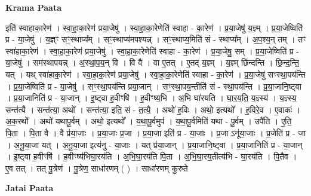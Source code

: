 \documentclass[17pt]{extarticle}
\begin{document}
\textbf{Krama Paata} \newline

इति॑ स्वाहाका॒रेण॑ । स्वा॒हा॒का॒रेण॑ प्रया॒जेषु॑ । स्वा॒हा॒का॒रेणेति॑ स्वाहा - का॒रेण॑ । प्र॒या॒जेषु॑ य॒ज्ञ्म् । प्र॒या॒जेष्विति॑ प्र - या॒जेषु॑ । य॒ज्ञ्ꣳ सꣳ॒॒स्थाप्य᳚म् । सꣳ॒॒स्थाप्य॑मपश्यन्न् । सꣳ॒॒स्थाप्य॒मिति॑ सं - स्थाप्य᳚म् । अ॒प॒श्य॒न् तम् । तꣳ स्वा॑हाका॒रेण॑ । स्वा॒हा॒का॒रेण॑ प्रया॒जेषु॑ । स्वा॒हा॒का॒रेणेति॑ स्वाहा - का॒रेण॑ । प्र॒या॒जेषु॒ सम् । प्र॒या॒जेष्विति॑ प्र - या॒जेषु॑ । सम॑स्थापयन्न् । अ॒स्था॒प॒य॒न् वि । वि वै । वा ए॒तत् । ए॒तद् य॒ज्ञ्म् । य॒ज्ञ्म् छि॑न्दन्ति । छि॒न्द॒न्ति॒ यत् । यथ् स्वा॑हाका॒रेण॑ । स्वा॒हा॒का॒रेण॑ प्रया॒जेषु॑ । स्वा॒हा॒का॒रेणेति॑ स्वाहा - का॒रेण॑ । प्र॒या॒जेषु॑ सꣳस्था॒पय॑न्ति । प्र॒या॒जेष्विति॑ प्र - या॒जेषु॑ । सꣳ॒॒स्था॒पय॑न्ति प्रया॒जान् । सꣳ॒॒स्था॒पय॒न्तीति॑ सं - स्था॒पय॑न्ति । प्र॒या॒जानि॒ष्ट्वा । प्र॒या॒जानिति॑ प्र - या॒जान् । इ॒ष्ट्वा ह॒वीꣳषि॑ । ह॒वीꣳष्य॒भि । अ॒भि घा॑रयति । घा॒र॒य॒ति॒ य॒ज्ञ्स्य॑ । य॒ज्ञ्स्य॒ सन्त॑त्यै । सन्त॑त्या॒ अथो᳚ । सन्त॑त्या॒ इति॒ सं - त॒त्यै॒ । अथो॑ ह॒विः । अथो॒ इत्यथो᳚ । ह॒विरे॒व । ए॒वाकः॑ । अ॒क॒रथो᳚ । अथो॑ यथापू॒र्वम् । अथो॒ इत्यथो᳚ । य॒था॒पू॒र्वमुप॑ । य॒था॒पू॒र्वमिति॑ यथा - पू॒र्वम् । उपै॑ति । ए॒ति॒ पि॒ता । पि॒ता वै । वै प्र॑या॒जाः । प्र॒या॒जाः प्र॒जा । प्र॒या॒जा इति॑ प्र - या॒जाः । प्र॒जा ऽनू॑या॒जाः । प्र॒जेति॑ प्र - जा । अ॒नू॒या॒जा यत् । अ॒नू॒या॒जा इत्य॑नु - या॒जाः । यत् प्र॑या॒जान् । प्र॒या॒जानि॒ष्ट्वा । प्र॒या॒जानिति॑ प्र - या॒जान् । इ॒ष्ट्वा ह॒वीꣳषि॑ । ह॒वीꣳष्य॑भिघा॒रय॑ति । अ॒भि॒घा॒रय॑ति पि॒ता । अ॒भि॒घा॒रय॒तीत्य॑भि - घा॒रय॑ति । पि॒तैव । ए॒व तत् । तत् पु॒त्रेण॑ । पु॒त्रेण॒ साधा॑रणम् ( ) । साधा॑रणम् कुरुते \newline

\textbf{Jatai Paata} \newline
\end{document}
